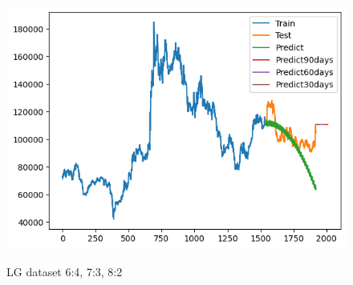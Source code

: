 \documentclass[conference]{IEEEtran}
\begin{document}
\begin{figure}[H]
\begin{minipage}{0.15\textwidth}
    \label{fig:2}
    \end{minipage}%
    \begin{minipage}{0.15\textwidth}
    \centering
    \includegraphics[width=1\textwidth]{Image/ARIMA/LG_8_2_Arima.png}

    \label{fig:3}
    \end{minipage}
    \caption{LG dataset 6:4, 7:3, 8:2}
\end{figure}
\end{document}
